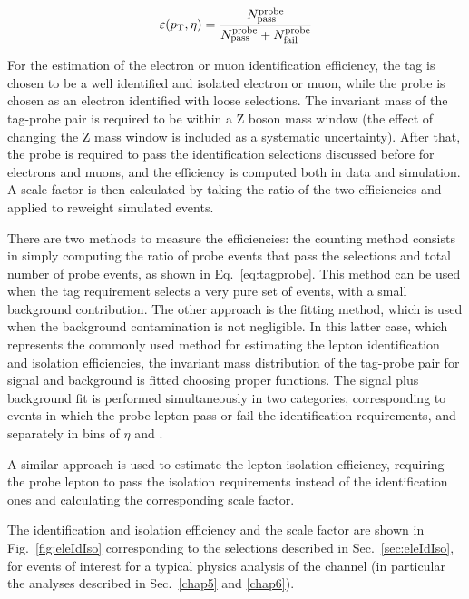 \begin{equation}\label{eq:tagprobe}
\varepsilon(p_\mathrm{T},\eta) = \frac{ N^\mathrm{probe}_\mathrm{pass}}{N^\mathrm{probe}_\mathrm{pass} + N^\mathrm{probe}_\mathrm{fail}}
\end{equation}

For the estimation of the electron or muon identification efficiency, the tag is chosen to be a well identified and isolated electron or muon, while the probe is chosen as an electron identified with loose selections. The invariant mass of the tag-probe pair is required to be within a Z boson mass window (the effect of changing the Z mass window is included as a systematic uncertainty). After that, the probe is required to pass the identification selections discussed before for electrons and muons, and the efficiency is computed both in data and simulation. A scale factor is then calculated by taking the ratio of the two efficiencies and applied to reweight simulated events.

There are two methods to measure the efficiencies: the counting method consists in simply computing the ratio of probe events that pass the selections and total number of probe events, as shown in Eq.~\eqref{eq:tagprobe}. This method can be used when the tag requirement selects a very pure set of events, with a small background contribution. The other approach is the fitting method, which is used when the background contamination is not negligible. In this latter case, which represents the commonly used method for estimating the lepton identification and isolation efficiencies, the invariant mass distribution of the tag-probe pair for signal and background is fitted choosing proper functions. The signal plus background fit is performed simultaneously in two categories, corresponding to events in which the probe lepton pass or fail the identification requirements, and separately in bins of $\eta$ and \pt.

A similar approach is used to estimate the lepton isolation efficiency, requiring the probe lepton to pass the isolation requirements instead of the identification ones and calculating the corresponding scale factor.

The identification and isolation efficiency and the scale factor are shown in Fig.~\ref{fig:eleIdIso} corresponding to the selections described in Sec.~\ref{sec:eleIdIso}, for events of interest for a typical physics analysis of the \hwwllnn channel (in particular the analyses described in Sec.~\ref{chap5} and \ref{chap6}).

